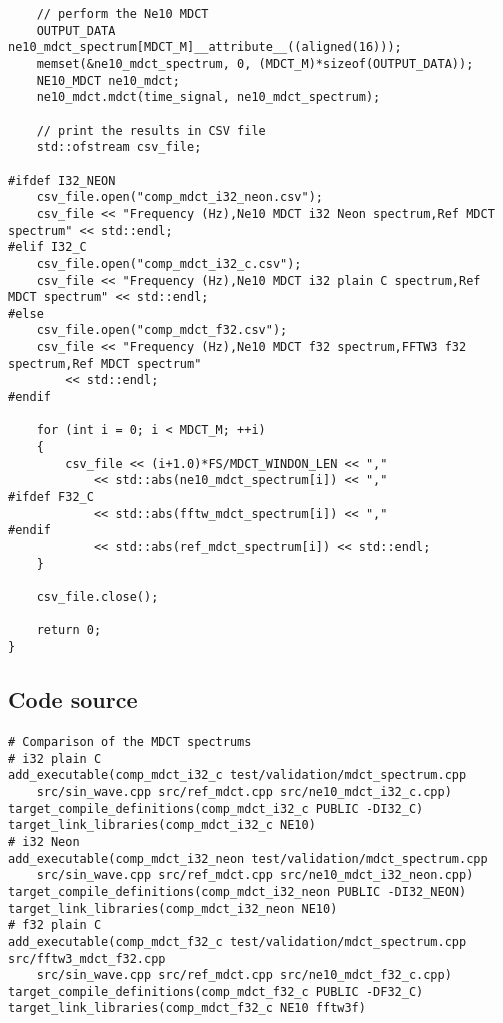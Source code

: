\documentclass{article}
\begin{document}
\begin{lstlisting}
    // perform the Ne10 MDCT
    OUTPUT_DATA ne10_mdct_spectrum[MDCT_M]__attribute__((aligned(16)));
    memset(&ne10_mdct_spectrum, 0, (MDCT_M)*sizeof(OUTPUT_DATA));
    NE10_MDCT ne10_mdct;
    ne10_mdct.mdct(time_signal, ne10_mdct_spectrum);

    // print the results in CSV file
    std::ofstream csv_file;

#ifdef I32_NEON
    csv_file.open("comp_mdct_i32_neon.csv");
    csv_file << "Frequency (Hz),Ne10 MDCT i32 Neon spectrum,Ref MDCT spectrum" << std::endl;
#elif I32_C
    csv_file.open("comp_mdct_i32_c.csv");
    csv_file << "Frequency (Hz),Ne10 MDCT i32 plain C spectrum,Ref MDCT spectrum" << std::endl;
#else
    csv_file.open("comp_mdct_f32.csv");
    csv_file << "Frequency (Hz),Ne10 MDCT f32 spectrum,FFTW3 f32 spectrum,Ref MDCT spectrum"
        << std::endl;
#endif

    for (int i = 0; i < MDCT_M; ++i)
    {
        csv_file << (i+1.0)*FS/MDCT_WINDON_LEN << ","
            << std::abs(ne10_mdct_spectrum[i]) << ","
#ifdef F32_C
            << std::abs(fftw_mdct_spectrum[i]) << ","
#endif
            << std::abs(ref_mdct_spectrum[i]) << std::endl;
    }

    csv_file.close();

    return 0;
}
\end{lstlisting}

\subsection{Code source}\label{app:spectrum_comparison_cmake}
\paragraph{}
\lstset{language=make}
\begin{lstlisting}
# Comparison of the MDCT spectrums
# i32 plain C
add_executable(comp_mdct_i32_c test/validation/mdct_spectrum.cpp
    src/sin_wave.cpp src/ref_mdct.cpp src/ne10_mdct_i32_c.cpp)
target_compile_definitions(comp_mdct_i32_c PUBLIC -DI32_C)
target_link_libraries(comp_mdct_i32_c NE10)
# i32 Neon
add_executable(comp_mdct_i32_neon test/validation/mdct_spectrum.cpp
    src/sin_wave.cpp src/ref_mdct.cpp src/ne10_mdct_i32_neon.cpp)
target_compile_definitions(comp_mdct_i32_neon PUBLIC -DI32_NEON)
target_link_libraries(comp_mdct_i32_neon NE10)
# f32 plain C
add_executable(comp_mdct_f32_c test/validation/mdct_spectrum.cpp src/fftw3_mdct_f32.cpp
    src/sin_wave.cpp src/ref_mdct.cpp src/ne10_mdct_f32_c.cpp)
target_compile_definitions(comp_mdct_f32_c PUBLIC -DF32_C)
target_link_libraries(comp_mdct_f32_c NE10 fftw3f)
\end{lstlisting}
\end{document}
